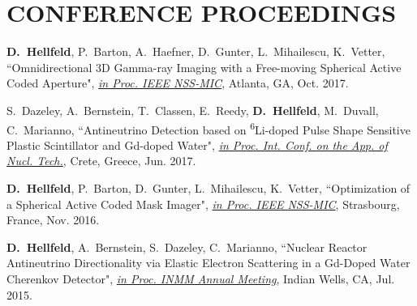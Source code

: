 \section{\small{CONFERENCE PROCEEDINGS}}

 \begin{thebibliography}{3}
 \raggedright
 \vspace{10pt}
 


 \textbf{D.~Hellfeld}, P.~Barton, A.~Haefner, D.~Gunter, L.~Mihailescu, K.~Vetter, ``Omnidirectional 3D Gamma-ray Imaging with a Free-moving Spherical Active Coded Aperture", \href{http://ewh.ieee.org/soc/nps/nss-mic/2017/News.html}{\emph{in Proc. IEEE NSS-MIC}}, Atlanta, GA, Oct. 2017.


  S.~Dazeley, A.~Bernstein, T.~Classen, E.~Reedy, \textbf{D.~Hellfeld}, M.~Duvall, C.~Marianno, ``Antineutrino Detection based on \textsuperscript{6}Li-doped Pulse Shape Sensitive Plastic Scintillator and Gd-doped Water", \href{http://www.creteconf.org/index.html}{\emph{in Proc. Int. Conf. on the App. of Nucl. Tech.}}, Crete, Greece, Jun. 2017. 
 
  \textbf{D.~Hellfeld}, P.~Barton, D.~Gunter, L.~Mihailescu, K.~Vetter, ``Optimization of a Spherical Active Coded Mask Imager", \href{http://ieeexplore.ieee.org/document/8069853/}{\emph{in Proc. IEEE NSS-MIC}}, Strasbourg, France, Nov. 2016. 
 
  \textbf{D.~Hellfeld}, A.~Bernstein, S.~Dazeley, C.~Marianno, ``Nuclear Reactor Antineutrino Directionality via Elastic Electron Scattering in a Gd-Doped Water Cherenkov Detector", \href{https://www.inmm.org/INMM-Resources/Proceedings-Presentations/Annual-Meeting-Proceedings}{\emph{in Proc. INMM Annual Meeting}}, Indian Wells, CA, Jul. 2015. 
 
 \end{thebibliography}

